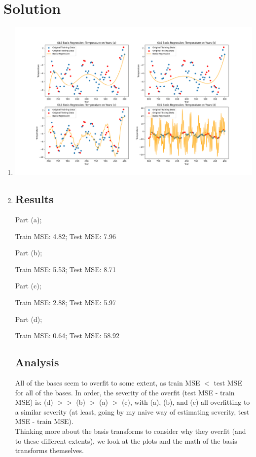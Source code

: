 \documentclass[submit]{harvardml}
\newenvironment{solution}
  {\color{blue}\section*{Solution}}
{}
\begin{document}
\begin{solution}
\begin{enumerate}
    \item \includegraphics[scale=0.4]{images/p3.1.png}
    \item 

\subsection*{Results}
    Part (a);

 Train MSE: 4.82; Test MSE: 7.96


Part (b);

 Train MSE: 5.53; Test MSE: 8.71


Part (c);

 Train MSE: 2.88; Test MSE: 5.97


Part (d);

 Train MSE: 0.64; Test MSE: 58.92
    
\subsection*{Analysis}
    
    All of the bases seem to overfit to some extent, as train MSE $<$ test MSE for all of the bases. In order, the severity of the overfit (test MSE - train MSE) is: (d) $>>$ (b) $>$ (a) $>$ (c), with (a), (b), and (c) all overfitting to a similar severity (at least, going by my naive way of estimating severity, test MSE - train MSE).\\

    Thinking more about the basis transforms to consider why they overfit (and to these different extents), we look at the plots and the math of the basis transforms themselves.\\
    

\end{enumerate}
\end{solution}
\end{document}
